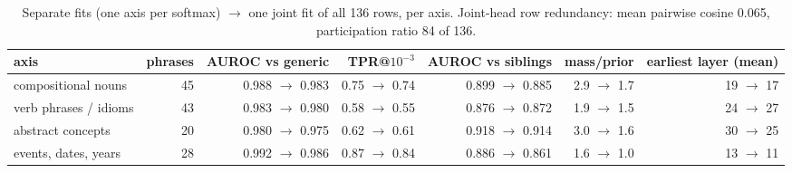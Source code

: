 \begin{table}[t]
\centering
\footnotesize
\caption{Separate fits (one axis per softmax) $\to$ one joint fit of all 136 rows, per axis. Joint-head row redundancy: mean pairwise cosine 0.065, participation ratio 84 of 136.}
\label{tab:gen_joint}
\begin{adjustbox}{max width=\textwidth}
\begin{tabular}{lrrrrrr}
\toprule
axis & phrases & AUROC vs generic & TPR@$10^{-3}$ & AUROC vs siblings & mass/prior & earliest layer (mean) \\
\midrule
compositional nouns & 45 & 0.988 $\to$ 0.983 & 0.75 $\to$ 0.74 & 0.899 $\to$ 0.885 & 2.9 $\to$ 1.7 & 19 $\to$ 17 \\
verb phrases / idioms & 43 & 0.983 $\to$ 0.980 & 0.58 $\to$ 0.55 & 0.876 $\to$ 0.872 & 1.9 $\to$ 1.5 & 24 $\to$ 27 \\
abstract concepts & 20 & 0.980 $\to$ 0.975 & 0.62 $\to$ 0.61 & 0.918 $\to$ 0.914 & 3.0 $\to$ 1.6 & 30 $\to$ 25 \\
events, dates, years & 28 & 0.992 $\to$ 0.986 & 0.87 $\to$ 0.84 & 0.886 $\to$ 0.861 & 1.6 $\to$ 1.0 & 13 $\to$ 11 \\
\bottomrule
\end{tabular}
\end{adjustbox}
\end{table}